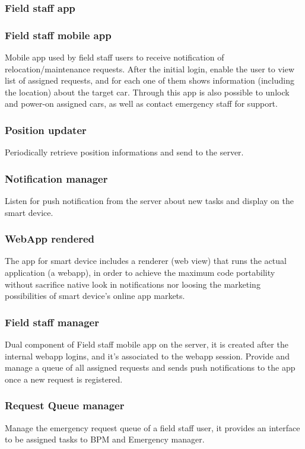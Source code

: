 \documentclass[english]{article}
\begin{document}
	
\subsubsection*{Field staff app}
	
	\subsubsection{Field staff mobile app}
	Mobile app used by field staff users to receive notification of relocation/maintenance requests. After the initial login, enable the user to view list of assigned requests, and for each one of them shows information (including the location) about the target car. Through this app is also possible to unlock and power-on assigned cars, as well as contact emergency staff for support.
		\subsubsection{Position updater}
		Periodically retrieve position informations and send to the server.
		\subsubsection{Notification manager}
		Listen for push notification from the server about new tasks and display on the smart device.
		\subsubsection{WebApp rendered}
		The app for smart device includes a renderer (web view) that runs the actual application (a webapp), in order to achieve the maximum code portability without sacrifice native look in notifications nor loosing the marketing possibilities of smart device's online app markets.
	\subsubsection{Field staff manager}
	Dual component of Field staff mobile app on the server, it is created after the internal webapp logins, and it's associated to the webapp session. Provide and manage a queue of all assigned requests and sends push notifications to the app once a new request is registered. 
		\subsubsection{Request Queue manager}
		Manage the emergency request queue of a field staff user, it provides an interface to be assigned tasks to BPM and Emergency manager.
\end{document}
